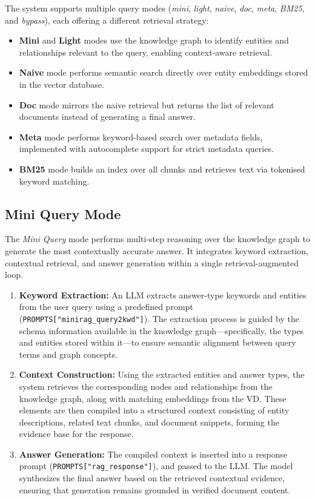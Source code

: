 The system supports multiple query modes (\textit{mini}, \textit{light}, \textit{naive}, \textit{doc}, \textit{meta}, \textit{BM25}, and \textit{bypass}), each offering a different retrieval strategy:
\begin{itemize}
    \item \textbf{Mini} and \textbf{Light} modes use the knowledge graph to identify entities and relationships relevant to the query, enabling context-aware retrieval.
    \item \textbf{Naive} mode performs semantic search directly over entity embeddings stored in the vector database.
    \item \textbf{Doc} mode mirrors the naive retrieval but returns the list of relevant documents instead of generating a final answer.
    \item \textbf{Meta} mode performs keyword-based search over metadata fields, implemented with autocomplete support for strict metadata queries.
    \item \textbf{BM25} mode builds an index over all chunks and retrieves text via tokenised keyword matching.
\end{itemize}
\subsection{Mini Query Mode}

The \textit{Mini Query} mode performs multi-step reasoning over the knowledge graph to generate the most contextually accurate answer.  
It integrates keyword extraction, contextual retrieval, and answer generation within a single retrieval-augmented loop.

\begin{enumerate}
    \item \textbf{Keyword Extraction:}  
    An \gls{LLM} extracts answer-type keywords and entities from the user query using a predefined prompt (\texttt{PROMPTS["minirag\_query2kwd"]}).
    The extraction process is guided by the schema information available in the knowledge graph—specifically, the types and entities stored within it—to ensure semantic alignment between query terms and graph concepts.
    
    \item \textbf{Context Construction:}  
    Using the extracted entities and answer types, the system retrieves the corresponding nodes and relationships from the knowledge graph, along with matching embeddings from the \gls{VD}.
    These elements are then compiled into a structured context consisting of entity descriptions, related text chunks, and document snippets, forming the evidence base for the response.
    
    \item \textbf{Answer Generation:}  
    The compiled context is inserted into a response prompt (\texttt{PROMPTS["rag\_response"]}), and passed to the \gls{LLM}.
    The model synthesizes the final answer based on the retrieved contextual evidence, ensuring that generation remains grounded in verified document content.
\end{enumerate}

